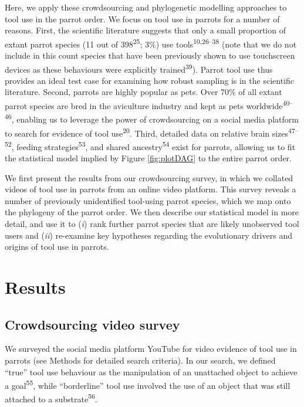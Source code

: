 \documentclass[
  man,floatsintext]{apa6}
\begin{document}
Here, we apply these crowdsourcing and phylogenetic modelling approaches to tool use in the parrot order. We focus on tool use in parrots for a number of reasons. First, the scientific literature suggests that only a small proportion of extant parrot species (11 out of 398\textsuperscript{25}; 3\%) use tools\textsuperscript{10,26--38} (note that we do not include in this count species that have been previously shown to use touchscreen devices as these behaviours were explicitly trained\textsuperscript{39}). Parrot tool use thus provides an ideal test case for examining how robust sampling is in the scientific literature. Second, parrots are highly popular as pets. Over 70\% of all extant parrot species are bred in the aviculture industry and kept as pets worldwide\textsuperscript{40--46}, enabling us to leverage the power of crowdsourcing on a social media platform to search for evidence of tool use\textsuperscript{20}. Third, detailed data on relative brain sizes\textsuperscript{47--52}, feeding strategies\textsuperscript{53}, and shared ancestry\textsuperscript{54} exist for parrots, allowing us to fit the statistical model implied by Figure \ref{fig:plotDAG} to the entire parrot order.

We first present the results from our crowdsourcing survey, in which we collated videos of tool use in parrots from an online video platform. This survey reveals a number of previously unidentified tool-using parrot species, which we map onto the phylogeny of the parrot order. We then describe our statistical model in more detail, and use it to (\emph{i}) rank further parrot species that are likely unobserved tool users and (\emph{ii}) re-examine key hypotheses regarding the evolutionary drivers and origins of tool use in parrots.

\hypertarget{results}{%
\section{Results}\label{results}}

\hypertarget{crowdsourcing-video-survey}{%
\subsection{Crowdsourcing video survey}\label{crowdsourcing-video-survey}}

We surveyed the social media platform YouTube for video evidence of tool use in parrots (see Methods for detailed search criteria). In our search, we defined ``true'' tool use behaviour as the manipulation of an unattached object to achieve a goal\textsuperscript{55}, while ``borderline'' tool use involved the use of an object that was still attached to a substrate\textsuperscript{56}.
\end{document}
